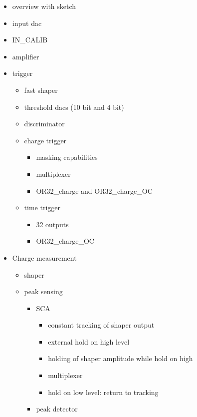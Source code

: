 \begin{itemize}
    \item overview with sketch
    \item input dac
    \item IN\_CALIB
    \item amplifier
    \item trigger
    \begin{itemize}
        \item fast shaper
        \item threshold dacs (10 bit and 4 bit)
        \item discriminator 
        \item charge trigger
        \begin{itemize}
            \item masking capabilities
            \item multiplexer
            \item OR32\_charge and OR32\_charge\_OC
        \end{itemize}
        \item time trigger
        \begin{itemize}
            \item 32 outputs
            \item OR32\_charge\_OC
        \end{itemize}
    \end{itemize}
    \item Charge measurement
    \begin{itemize}
        \item shaper
        \item peak sensing
        \begin{itemize}
            \item SCA
            \begin{itemize}
                \item constant tracking of shaper output
                \item external hold on high level
                \item holding of shaper amplitude while hold on high
                \item multiplexer
                \item hold on low level: return to tracking
            \end{itemize}
            \item peak detector
            \begin{itemize}

\end{itemize}
\end{itemize}
\end{itemize}
\end{itemize}
